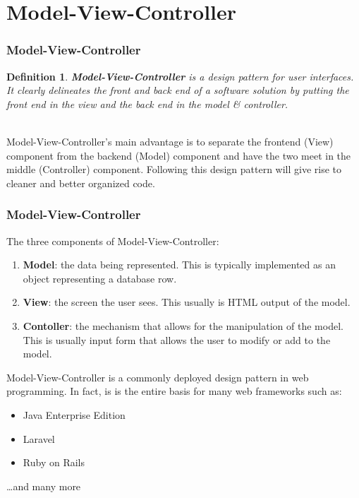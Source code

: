 \documentclass[aspectratio=169]{beamer}
\newtheorem{defn}{Definition}
\begin{document}
\section{Model-View-Controller}
\begin{frame}
\frametitle{Model-View-Controller}
\begin{defn}
\textbf{Model-View-Controller} is a design pattern for user interfaces. It clearly delineates the front and back end of a software solution by putting the front end in the view and the back end in the model \& controller.
\end{defn}
\pause
\mbox{}\\
Model-View-Controller's main advantage is to separate the frontend (View) component from the backend (Model) component and have the two meet in the middle (Controller) component. Following this design pattern will give rise to cleaner and better organized code.
\end{frame}

\begin{frame}
\frametitle{Model-View-Controller}
The three components of Model-View-Controller:
\begin{enumerate}
	\item \textbf{Model}: the data being represented. This is typically implemented as an object representing a database row.
	\item \textbf{View}: the screen the user sees. This usually is  HTML output of the model. 
	\item \textbf{Contoller}: the mechanism that allows for the manipulation of the model. This is usually input form that allows the user to modify or add to the model.
\end{enumerate}
Model-View-Controller is a commonly deployed design pattern in web programming. In fact, is is the entire basis for many web frameworks such as:
\begin{itemize}
	\item Java Enterprise Edition
	\item Laravel
	\item Ruby on Rails
\end{itemize}
\dots and many more
\end{frame}
\end{document}
